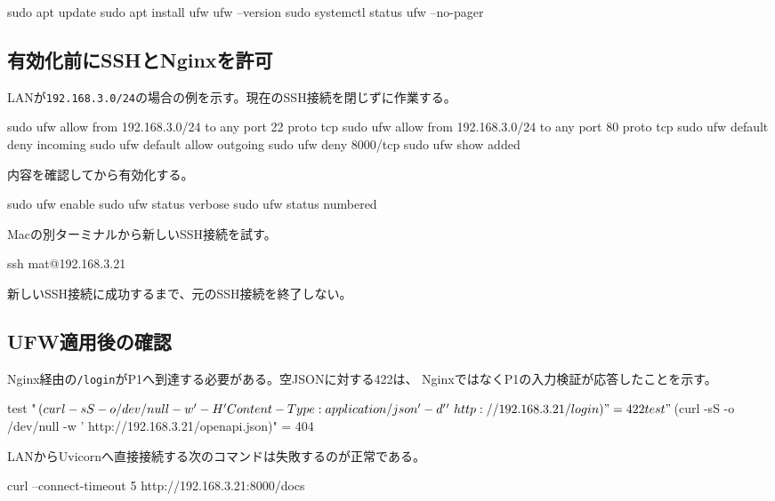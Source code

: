 \documentclass[uplatex,a4paper,11pt]{jsarticle}
\begin{document}
\begin{command}
sudo apt update
sudo apt install ufw
ufw --version
sudo systemctl status ufw --no-pager
\end{command}

\subsection{有効化前にSSHとNginxを許可}

LANが\texttt{192.168.3.0/24}の場合の例を示す。現在のSSH接続を閉じずに作業する。

\begin{command}
sudo ufw allow from 192.168.3.0/24 to any port 22 proto tcp
sudo ufw allow from 192.168.3.0/24 to any port 80 proto tcp
sudo ufw default deny incoming
sudo ufw default allow outgoing
sudo ufw deny 8000/tcp
sudo ufw show added
\end{command}

内容を確認してから有効化する。

\begin{command}
sudo ufw enable
sudo ufw status verbose
sudo ufw status numbered
\end{command}

Macの別ターミナルから新しいSSH接続を試す。

\begin{command}
ssh mat@192.168.3.21
\end{command}

新しいSSH接続に成功するまで、元のSSH接続を終了しない。

\subsection{UFW適用後の確認}

Nginx経由の\texttt{/login}がP1へ到達する必要がある。空JSONに対する422は、
NginxではなくP1の入力検証が応答したことを示す。

\begin{command}
test "$(curl -sS -o /dev/null -w '%
  -H 'Content-Type: application/json' -d '{}' \
  http://192.168.3.21/login)" = 422
test "$(curl -sS -o /dev/null -w '%
  http://192.168.3.21/openapi.json)" = 404
\end{command}

LANからUvicornへ直接接続する次のコマンドは失敗するのが正常である。

\begin{command}
curl --connect-timeout 5 http://192.168.3.21:8000/docs
\end{command}
\end{document}
